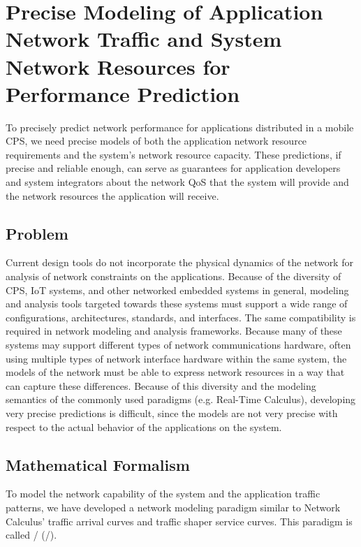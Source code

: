 \section{Precise Modeling of Application Network Traffic and System Network Resources for Performance Prediction}
\label{sec:framework} 

To precisely predict network performance for applications distributed
in a mobile CPS, we need precise models of both the application
network resource requirements and the system's network resource
capacity.  These predictions, if precise and reliable enough, can
serve as guarantees for application developers and system integrators
about the network QoS that the system will provide and the network
resources the application will receive.

\subsection{Problem}
Current design tools do not incorporate the physical dynamics of the
network for analysis of network constraints on the
applications. Because of the diversity of CPS, IoT systems, and other
networked embedded systems in general, modeling and analysis tools
targeted towards these systems must support a wide range of
configurations, architectures, standards, and interfaces.  The same
compatibility is required in network modeling and analysis frameworks.
Because many of these systems may support different types of network
communications hardware, often using multiple types of network
interface hardware within the same system, the models of the network
must be able to express network resources in a way that can capture
these differences.  Because of this diversity and the modeling
semantics of the commonly used paradigms (e.g. Real-Time Calculus),
developing very precise predictions is difficult, since the models are
not very precise with respect to the actual behavior of the
applications on the system.

\subsection{Mathematical Formalism}
\label{subsec:math_formalism}

To model the network capability of the system and the application
traffic patterns, we have developed a network modeling paradigm
similar to Network Calculus' traffic arrival curves and traffic shaper
service curves.  This paradigm is called \fulltool/ (\shorttool/). 

